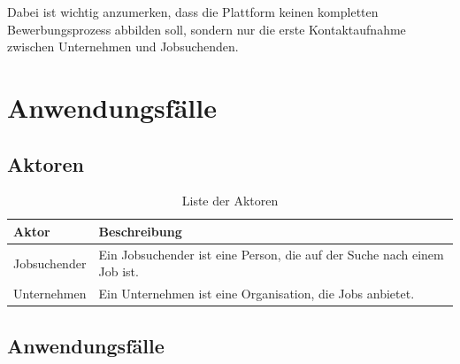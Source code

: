 \documentclass[12pt, letterpaper]{article}
\begin{document}
    Dabei ist wichtig anzumerken, dass die Plattform keinen kompletten Bewerbungsprozess
    abbilden soll, sondern nur die erste Kontaktaufnahme zwischen Unternehmen und Jobsuchenden.

    \newpage
    \section{Anwendungsfälle}
    

    \subsection{Aktoren}

    \begin{table}[htbp]
        \label{tab:aktoren}
        \begin{tabular}{|p{}|p{}|}
            \hline
            \textbf{Aktor} & \textbf{Beschreibung} \\
            \hline
            \hline
            Jobsuchender & Ein Jobsuchender ist eine Person, die auf der Suche nach einem Job ist. \\
            \hline
            Unternehmen & Ein Unternehmen ist eine Organisation, die Jobs anbietet. \\
            \hline
        \end{tabular}
        \caption{Liste der Aktoren}
    \end{table}

    \subsection{Anwendungsfälle}
\end{document}
